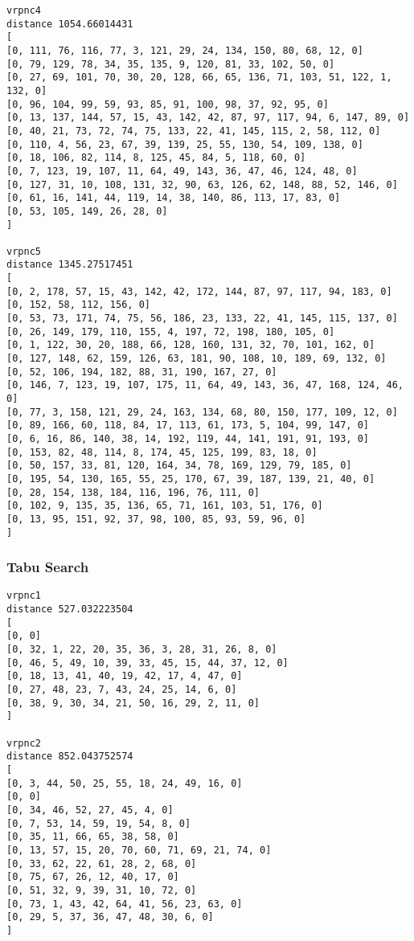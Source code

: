 \documentclass{article} %
\begin{document}
{\begin{lstlisting}[breaklines, basicstyle=\tiny]
vrpnc4
distance 1054.66014431
[
[0, 111, 76, 116, 77, 3, 121, 29, 24, 134, 150, 80, 68, 12, 0]
[0, 79, 129, 78, 34, 35, 135, 9, 120, 81, 33, 102, 50, 0]
[0, 27, 69, 101, 70, 30, 20, 128, 66, 65, 136, 71, 103, 51, 122, 1, 132, 0]
[0, 96, 104, 99, 59, 93, 85, 91, 100, 98, 37, 92, 95, 0]
[0, 13, 137, 144, 57, 15, 43, 142, 42, 87, 97, 117, 94, 6, 147, 89, 0]
[0, 40, 21, 73, 72, 74, 75, 133, 22, 41, 145, 115, 2, 58, 112, 0]
[0, 110, 4, 56, 23, 67, 39, 139, 25, 55, 130, 54, 109, 138, 0]
[0, 18, 106, 82, 114, 8, 125, 45, 84, 5, 118, 60, 0]
[0, 7, 123, 19, 107, 11, 64, 49, 143, 36, 47, 46, 124, 48, 0]
[0, 127, 31, 10, 108, 131, 32, 90, 63, 126, 62, 148, 88, 52, 146, 0]
[0, 61, 16, 141, 44, 119, 14, 38, 140, 86, 113, 17, 83, 0]
[0, 53, 105, 149, 26, 28, 0]
]

vrpnc5
distance 1345.27517451
[
[0, 2, 178, 57, 15, 43, 142, 42, 172, 144, 87, 97, 117, 94, 183, 0]
[0, 152, 58, 112, 156, 0]
[0, 53, 73, 171, 74, 75, 56, 186, 23, 133, 22, 41, 145, 115, 137, 0]
[0, 26, 149, 179, 110, 155, 4, 197, 72, 198, 180, 105, 0]
[0, 1, 122, 30, 20, 188, 66, 128, 160, 131, 32, 70, 101, 162, 0]
[0, 127, 148, 62, 159, 126, 63, 181, 90, 108, 10, 189, 69, 132, 0]
[0, 52, 106, 194, 182, 88, 31, 190, 167, 27, 0]
[0, 146, 7, 123, 19, 107, 175, 11, 64, 49, 143, 36, 47, 168, 124, 46, 0]
[0, 77, 3, 158, 121, 29, 24, 163, 134, 68, 80, 150, 177, 109, 12, 0]
[0, 89, 166, 60, 118, 84, 17, 113, 61, 173, 5, 104, 99, 147, 0]
[0, 6, 16, 86, 140, 38, 14, 192, 119, 44, 141, 191, 91, 193, 0]
[0, 153, 82, 48, 114, 8, 174, 45, 125, 199, 83, 18, 0]
[0, 50, 157, 33, 81, 120, 164, 34, 78, 169, 129, 79, 185, 0]
[0, 195, 54, 130, 165, 55, 25, 170, 67, 39, 187, 139, 21, 40, 0]
[0, 28, 154, 138, 184, 116, 196, 76, 111, 0]
[0, 102, 9, 135, 35, 136, 65, 71, 161, 103, 51, 176, 0]
[0, 13, 95, 151, 92, 37, 98, 100, 85, 93, 59, 96, 0]
]
\end{lstlisting}

\newpage
\subsubsection{Tabu Search}
\begin{lstlisting}[breaklines, basicstyle=\tiny]
vrpnc1
distance 527.032223504
[
[0, 0]
[0, 32, 1, 22, 20, 35, 36, 3, 28, 31, 26, 8, 0]
[0, 46, 5, 49, 10, 39, 33, 45, 15, 44, 37, 12, 0]
[0, 18, 13, 41, 40, 19, 42, 17, 4, 47, 0]
[0, 27, 48, 23, 7, 43, 24, 25, 14, 6, 0]
[0, 38, 9, 30, 34, 21, 50, 16, 29, 2, 11, 0]
]

vrpnc2
distance 852.043752574
[
[0, 3, 44, 50, 25, 55, 18, 24, 49, 16, 0]
[0, 0]
[0, 34, 46, 52, 27, 45, 4, 0]
[0, 7, 53, 14, 59, 19, 54, 8, 0]
[0, 35, 11, 66, 65, 38, 58, 0]
[0, 13, 57, 15, 20, 70, 60, 71, 69, 21, 74, 0]
[0, 33, 62, 22, 61, 28, 2, 68, 0]
[0, 75, 67, 26, 12, 40, 17, 0]
[0, 51, 32, 9, 39, 31, 10, 72, 0]
[0, 73, 1, 43, 42, 64, 41, 56, 23, 63, 0]
[0, 29, 5, 37, 36, 47, 48, 30, 6, 0]
]


\end{lstlisting}}
\end{document}
